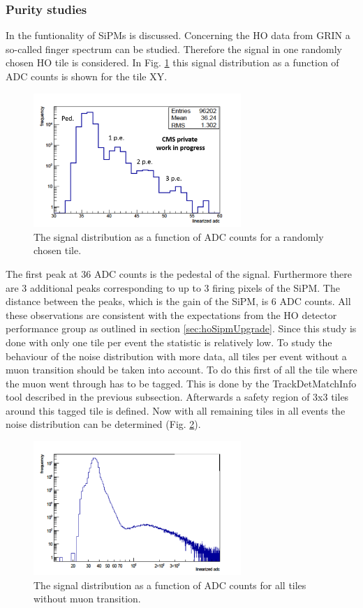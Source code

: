 		\subsubsection{Purity studies}
			In \cite{dn2014-020} the funtionality of SiPMs is discussed.
			Concerning the HO data from GRIN a so-called finger spectrum can be studied.
			Therefore the signal in one randomly chosen HO tile is considered.
			In Fig. \ref{fig:noise_low} this signal distribution as a function of ADC counts is shown for the tile XY.
			\begin{figure}[htbp]
				\centering
				\includegraphics[width=0.70\textwidth]{Figures/erdogan/noise_low.png}
				\caption{The signal distribution as a function of ADC counts for a randomly chosen tile.}
				\label{fig:noise_low}
			\end{figure}
			The first peak at 36 ADC counts is the pedestal of the signal.
			Furthermore there are 3 additional peaks corresponding to up to 3 firing pixels of the SiPM.
			The distance between the peaks, which is the gain of the SiPM, is 6 ADC counts.
			All these observations are consistent with the expectations from the HO detector performance group as outlined in section \ref{sec:hoSipmUpgrade}.
			Since this study is done with only one tile per event the statistic is relatively low.
			To study the behaviour of the noise distribution with more data, all tiles per event without a muon transition should be taken into account.
			To do this first of all the tile where the muon went through has to be tagged.
			This is done by the TrackDetMatchInfo tool described in the previous subsection.
			Afterwards a safety region of 3x3 tiles around this tagged tile is defined.
			Now with all remaining tiles in all events the noise distribution can be determined (Fig. \ref{fig:noise_high}).
			\begin{figure}[htbp]
				\centering
				\includegraphics[width=0.70\textwidth]{Figures/erdogan/noise_high.png}
				\caption{The signal distribution as a function of ADC counts for all tiles without muon transition.}
				\label{fig:noise_high}
			\end{figure}
